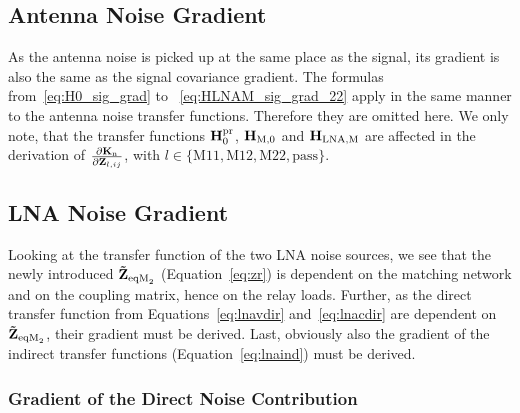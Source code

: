 \subsection{Antenna Noise Gradient}
\label{sec:ant_noise_grad}
As the antenna noise is picked up at the same place as the signal, its gradient is also the same as the signal covariance gradient.
The formulas from~\eqref{eq:H0_sig_grad} to ~\eqref{eq:HLNAM_sig_grad_22} apply in the same manner to the antenna noise transfer functions.
Therefore they are omitted here.
We only note, that the transfer functions $\mathbf{H}_0^{\text{pr}}$, $\mathbf{H}_\text{M,0}$ and $\mathbf{H}_\text{LNA,M}$ are affected in the derivation of $\frac{\partial\mathbf{K}_\text{n}}{\partial\mathbf{Z}_{l,ij}}$, with $l\in\{\text{M}11,\text{M}12,\text{M}22,\text{pass}\}$.

\subsection{LNA Noise Gradient}
\label{sec:lna_noise_grad}

Looking at the transfer function of the two LNA noise sources, we see that the newly introduced $\mathbf{\tilde{Z}}_{\text{eqM}_2}$ (Equation~\eqref{eq:zr}) is dependent on the matching network and on the coupling matrix, hence on the relay loads.
Further, as the direct transfer function from Equations~\eqref{eq:lnavdir} and~\eqref{eq:lnacdir} are dependent on $\mathbf{\tilde{Z}}_{\text{eqM}_2}$, their gradient must be derived.
Last, obviously also the gradient of the indirect transfer functions (Equation~\eqref{eq:lnaind}) must be derived.

\subsubsection{Gradient of the Direct Noise Contribution}

